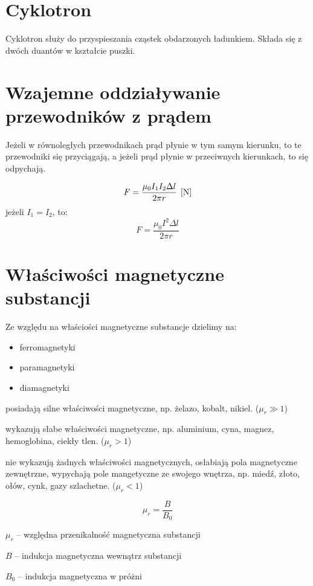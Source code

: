   \section{Cyklotron}
    Cyklotron służy do przyspieszania cząstek obdarzonych ładunkiem. Składa się z dwóch duantów w kształcie puszki.

  \section{Wzajemne oddziaływanie przewodników z prądem}
    Jeżeli w równoległych przewodnikach prąd płynie w tym samym kierunku, to te przewodniki się przyciągają, a jeżeli prąd płynie w przeciwnych kierunkach, to się odpychają.
    \begin{center}
      \begin{tikzpicture}
      \end{tikzpicture}
    \end{center}
    \begin{equation*}
      F = \frac{\mu_0I_1I_2\Delta l}{2\pi r} \unit N
    \end{equation*}
    jeżeli $I_1 = I_2$, to:
    \begin{equation*}
      F = \frac{\mu_0I^2\Delta l}{2\pi r}
    \end{equation*}

  \section{Właściwości magnetyczne substancji}
    Ze względu na właściości magnetyczne substancje dzielimy na:
    \begin{itemize}
      \item ferromagnetyki
      \item paramagnetyki
      \item diamagnetyki
    \end{itemize}


     posiadają silne właściwości magnetyczne, np. żelazo, kobalt, nikiel. ($\mu_r \gg 1$)

     wykazują słabe właściwości magnetyczne, np. aluminium, cyna, magnez, hemoglobina, ciekły tlen. ($\mu_r > 1$)

     nie wykazują żadnych właściwości magnetycznych, osłabiają pola magnetyczne zewnętrzne, wypychają pole mangetyczne ze swojego wnętrza, np. miedź, złoto, ołów, cynk, gazy szlachetne. ($\mu_r <1$)

    \begin{equation*}
      \mu_r = \frac{B}{B_0}
    \end{equation*}
    \begin{symbols}
     \item $\mu_r$ -- względna przenikalność magnetyczna substancji
     \item $B$ -- indukcja magnetyczna wewnątrz substancji
     \item $B_0$  -- indukcja magnetyczna w próżni
    \end{symbols}

